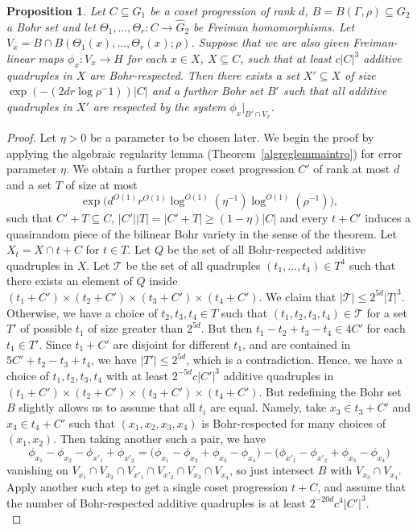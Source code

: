 \documentclass[a4paper,11pt]{article}
\numberwithin{theorem}{section}
\newtheorem{proposition}[theorem]{Proposition}
\theoremstyle{definition}
\begin{document}
\begin{proposition}\label{absgStep2bilBohrvar}
    Let $C \subseteq G_1$ be a coset progression of rank $d$, $B = B(\Gamma, \rho) \subseteq G_2$ a Bohr set and let $\Theta_1, \dots, \Theta_r : C \to \hat{G}_2$ be Freiman homomorphisms.
    Let $V_x = B \cap B(\Theta_1(x), \dots, \Theta_r(x); \rho)$.
    Suppose that we are also given Freiman-linear maps $\phi_x : V_x \to H$ for each $x \in X$, $X \subseteq C$, such that at least $c |C|^3$ additive quadruples in $X$ are Bohr-respected.
    Then there exists a set $X' \subseteq X$ of size $\exp(-(2dr\log \rho{^-1}))|C|$ and a further Bohr set $B'$ such that all additive quadruples in $X'$ are respected by the system $\phi_x|_{B' \cap V_x}$.
\end{proposition}

\begin{proof}
    Let $\eta > 0$ be a parameter to be chosen later. We begin the proof by applying the algebraic regularity lemma (Theorem~\ref{algreglemmaintro}) for error parameter $\eta$. We obtain a further proper coset progression $C'$ of rank at most $d$ and a set $T$ of size at most
\[\exp\Big(d^{O(1)} r^{O(1)} \log^{O(1)} (\eta^{-1}) \log^{O(1)} (\rho^{-1}) \Big),\]
such that $C' + T \subseteq C$, $|C'| |T| = |C' + T| \geq (1 - \eta) |C|$ and every $t + C'$ induces a quasirandom piece of the bilinear Bohr variety in the sense of the theorem. Let $X_t = X \cap t + C$ for $t \in T$. Let $Q$ be the set of all Bohr-respected additive quadruples in $X$. Let $\mathcal{T}$ be the set of all quadruples $(t_1, \dots, t_4) \in T^4$ such that there exists an element of $Q$ inside $(t_1 + C') \times (t_2 + C') \times (t_3 + C') \times (t_4 + C')$. We claim that $|\mathcal{T}| \leq 2^{5d} |T|^3$. Otherwise, we have a choice of $t_2, t_3, t_4 \in T$ such that $(t_1, t_2, t_3, t_4) \in \mathcal{T}$ for a set $T'$ of possible $t_1$ of size greater than $2^{5d}$. But then $t_1 - t_2 + t_3 - t_4 \in 4C'$ for each $t_1 \in T'$. Since $t_1 + C'$ are disjoint for different $t_1$, and are contained in $5C' + t_2 - t_3 + t_4$, we have $|T'| \leq 2^{5d}$, which is a contradiction. Hence, we have a choice of $t_1, t_2, t_3, t_4$ with at least $2^{-5d}c|C'|^3$ additive quadruples in $(t_1 + C') \times (t_2 + C') \times (t_3 + C') \times (t_4 + C')$. But redefining the Bohr set $B$ slightly allows us to assume that all $t_i$ are equal. Namely, take $x_3 \in t_3 + C'$ and $x_4 \in t_4 + C'$ such that $(x_1, x_2, x_3, x_4)$ is Bohr-respected for many choices of $(x_1, x_2)$. Then taking another such a pair, we have
\[\phi_{x_1} - \phi_{x_2} - \phi_{x'_1} + \phi_{x'_2} =\Big(\phi_{x_1} - \phi_{x_2} +\phi_{x_3} - \phi_{x_4}\Big)- \Big(\phi_{x'_1} - \phi_{x'_2} +\phi_{x_3} - \phi_{x_4}\Big) \]
vanishing on $V_{x_1} \cap V_{x_2} \cap V_{x'_1} \cap V_{x'_2} \cap V_{x_3} \cap V_{x_4}$, so just intersect $B$ with $V_{x_3} \cap V_{x_4}$. Apply another such step to get a single coset progression $t+ C$, and assume that the number of Bohr-respected additive quadruples is at least $2^{-20d}c^4|C'|^3$.\\
    

\end{proof}
\end{document}
